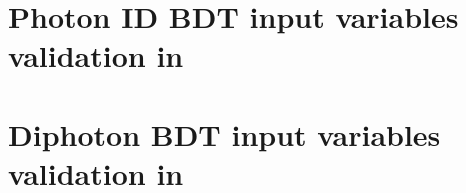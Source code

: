 \chapter{Photon ID BDT input variables validation in \Zee}
\label{app:photon_id}

\chapter{Diphoton BDT input variables validation in \Zee}
\label{app:diphoton_bdt}
